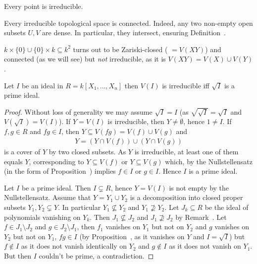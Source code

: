 \documentclass[a4paper,parskip=half,numbers=enddot, DIV=12]{scrreprt}
\begin{document}
	\begin{example}
		\begin{alphanumerate}
			\item Every point is irreducible.
			\item Every irreducible topological space is connected. Indeed, any two non-empty open subsets $U,V$ are dense. In particular, they intersect, ensuring Definition~.
			\item $k\times\{0\}\cup \{0\} \times k \subseteq k^2$ turns out to be Zariski-closed ( $=V(XY)$) and connected (as we will see) but \emph{not} irreducible, as it is $V(XY) =V(X)\cup V(Y)$.
		\end{alphanumerate}
		
	\end{example}
	\begin{prop}[a.k.a. Proposition 3]
		Let $I$ be an ideal in $R=k[X_1,\ldots, X_n]$ then $V(I)$ is irreducible iff $\sqrt{I}$ is a prime ideal.
	\end{prop}
	\begin{proof}
		Without loss of generality we may assume $\sqrt{I}=I$ (as $\sqrt{\sqrt{I}} = \sqrt{I}$ and $V(\sqrt{I}) = V(I)$). If $Y=V(I)$ is irreducible, then $Y\neq \emptyset$, hence $1\neq I$. If $f,g\in R$ and $fg\in I$, then $Y\subseteq V(fg) = V(f)\cup V(g)$ and 
		\begin{align*}
		Y= (Y\cap V(f))\cup (Y\cap V(g))
		\end{align*}
		is a cover of $Y$ by two closed subsets. As $Y$ is irreducible, at least one of them equals $Y$, corresponding to $Y\subseteq V(f)$ or $Y\subseteq V(g)$ which, by the Nullstellensatz (in the form of Proposition~) implies $f\in I$ or $g\in I$. Hence $I$ is a prime ideal.
		
		Let $I$ be a prime ideal. Then $I\subsetneq R$, hence $Y=V(I)$ is not empty by the Nullstellensatz. Assume that $Y=Y_1\cup Y_2$ is a decomposition into closed proper subsets $Y_1,Y_2\subsetneq Y$. In particular $Y_1\not \subseteq Y_2$ and $Y_1\not\supseteq Y_2$. Let $J_k\subseteq R$ be the ideal of polynomials vanishing on $Y_k$. Then $J_1\not \subseteq J_2$ and $J_1\not \supseteq J_2$ by Remark~. Let $f\in J_1\setminus J_2$ and $g\in J_2\setminus J_1$, then $f_1$ vanishes on $Y_1$ but not on $Y_2$ and $g$ vanishes on $Y_2$ but not on $Y_1$, $fg\in I$ (by Proposition~, as it vanishes on $Y$ and $I=\sqrt{I}$) but $f\not \in I$ as it does not vanish identically on $Y_2$ and $g\not\in I$ as it does not vanish on $Y_1$. But then $I$ couldn't be prime, a contradiction.
	\end{proof}
\end{document}
